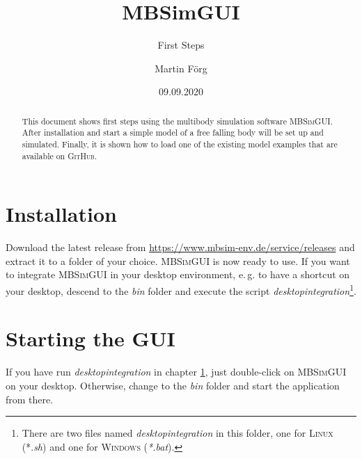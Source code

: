 \documentclass[
a4paper,
fleqn,
DIV=15,
pagesize
]{scrartcl}
\begin{document}
\subject{MBSim -- Environment}
\title{MBSimGUI}
\subtitle{First Steps}
\author{Martin Förg}
\date{09.09.2020}

\maketitle

\begin{abstract}
This document shows first steps using the multibody simulation software
\textsc{MBSimGUI}. After installation and start a
simple model of a free falling body will be set up and simulated. Finally, it is shown how to load one of the existing model examples that are available on \textsc{GitHub}.
\end{abstract}


\tableofcontents


\section{Installation} \label{installation}
Download the latest release from
\url{https://www.mbsim-env.de/service/releases} and extract it to a folder of
your choice. \textsc{MBSimGUI} is now ready to use. If you want to integrate
\textsc{MBSimGUI} in your desktop environment, e.\,g. to have a shortcut on
your desktop, descend to the \emph{bin} folder and execute the script
\emph{desktopintegration}\footnote{There are two files named
\emph{desktopintegration} in this folder, one for \textsc{Linux}
(*.\emph{sh}) and one for \textsc{Windows} (\emph{*.bat}).}.

\section{Starting the GUI}

If you have run \emph{desktopintegration} in chapter \ref{installation}, just double-click on \textsc{MBSimGUI} on your desktop. Otherwise, change to the \emph{bin} folder and start the application from there.
\end{document}
